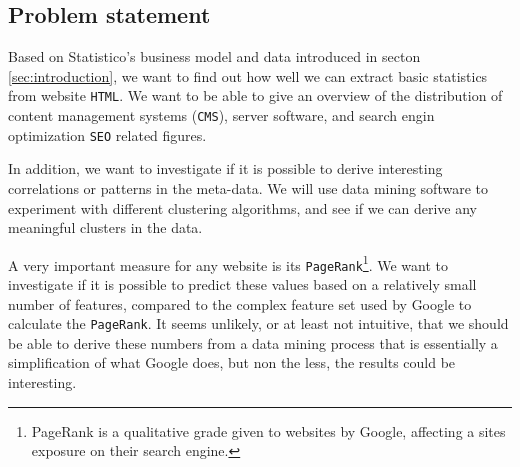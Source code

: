 
\subsection{Problem statement}
\label{subsec:problem_statement}
Based on Statistico's business model and data introduced in secton \ref{sec:introduction}, we want to find out how well we can extract basic statistics from website \texttt{HTML}. We want to be able to give an overview of the distribution of content management systems (\texttt{CMS}), server software, and search engin optimization \texttt{SEO} related figures.

In addition, we want to investigate if it is possible to derive interesting correlations or patterns in the meta-data. We will use data mining software to experiment with different clustering algorithms, and see if we can derive any meaningful clusters in the data.

A very important measure for any website is its \texttt{PageRank}\footnote{PageRank is a qualitative grade given to websites by Google, affecting a sites exposure on their search engine.}. We want to investigate if it is possible to predict these values based on a relatively small number of features, compared to the complex feature set used by Google to calculate the \texttt{PageRank}. It seems unlikely, or at least not intuitive, that we should be able to derive these numbers from a data mining process that is essentially a simplification of what Google does, but non the less, the results could be interesting.


